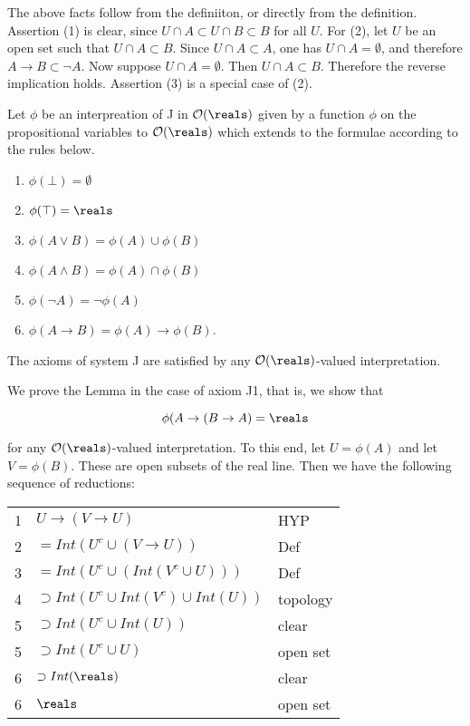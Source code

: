 The above facts follow from the definiiton, or directly from the definition.  Assertion (1) is clear, since $U \cap A \subset U \cap B \subset B$ for all $U$.  For (2), let $U$ be an open set such that $U \cap A \subset B$.  Since $U \cap A \subset A$, one has $U \cap A = \emptyset$, and therefore $A \to B \subset \neg A$.
Now suppose $U \cap A = \emptyset$.  Then $U \cap A \subset B$.  Therefore the reverse implication holds.  Assertion (3) is a special case of (2).


Let $\phi$ be an interpreation of J in $\opensets(\reals)$ given by a function $\phi$ on the propositional variables to $\opensets(\reals)$ which extends to the formulae according to the
rules below.

\begin{enumerate}

\item $\phi(\bot) = \emptyset$

\item $\phi(\top) = \reals$

\item $\phi(A \lor B) = \phi(A) \cup \phi(B)$

\item $\phi(A \land B) = \phi(A) \cap \phi(B)$

\item $\phi(\neg A) = \neg \phi(A)$

\item $\phi(A \to B) = \phi(A) \to \phi(B)$.

\end{enumerate} 

\begin{lemma} The axioms of system J are satisfied by any $\opensets(\reals)$-valued
interpretation.
\end{lemma}

We  prove the Lemma in the case of axiom J1, that is, we show that

$$
\phi(A \to (B \to A) = \reals
$$

for any $\opensets(\reals)$-valued interpretation.  To this end, let $U = \phi(A)$ and let $V = \phi(B)$.  These are open subsets of the real line.  Then we have the following sequence of reductions:

\begin{indent}
\begin{tabular}{lll}
1 & $U \to (V \to U)$ & HYP \\
2 & $= Int (U^c \cup (V \to U))$ & Def \\
3 & $= Int (U^c \cup (Int(V^c \cup U)))$ & Def \\
4 & $ \supset Int(U^c \cup Int(V^c) \cup Int(U))$ & topology \\
5 & $\supset Int(U^c \cup Int(U))$ & clear \\
5 & $\supset Int(U^c \cup U)$ & open set \\
6 & $\supset Int(\reals)$ &clear \\
6 & $\reals$ & open set \\
\end{tabular}
\end{indent}

